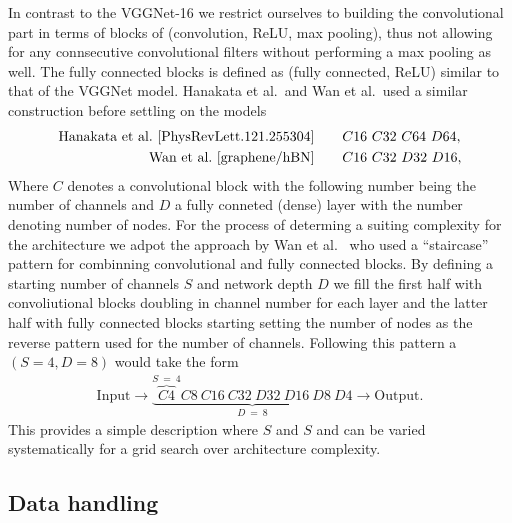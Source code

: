 In contrast to the VGGNet-16 we restrict ourselves to building the convolutional part in terms of blocks of (convolution, ReLU, max pooling), thus not allowing for any connsecutive convolutional filters without performing a max pooling as well. The fully connected blocks is defined as (fully connected, ReLU) similar to that of the VGGNet model. Hanakata et al.\ and Wan et al.\ used a similar construction before settling on the models
\begin{align*}
  \text{Hanakata et al.\ \cite{PhysRevLett.121.255304}} & \qquad C16 \ C32 \ C64 \ D64, \\ 
  \text{Wan et al.\ \cite{graphene/hBN}} & \qquad C16 \ C32 \ D32 \ D16,
\end{align*}
Where $C$ denotes a convolutional block with the following number being the number of channels and $D$ a fully conneted (dense) layer with the number denoting number of nodes. For the process of determing a suiting complexity for the architecture we adpot the approach by Wan et al.\ \cite{graphene/hBN} who used a ``staircase'' pattern for combinning convolutional and fully connected blocks. By defining a starting number of channels $S$ and network depth $D$ we fill the first half with convoliutional blocks doubling in channel number for each layer and the latter half with fully connected blocks starting setting the number of nodes as the reverse pattern used for the number of channels. Following this pattern a $(S=4, D=8)$ would take the form
\begin{align*}
  \text{Input} \to \underbrace{\overbrace{C4}^{S \ = \ 4}C8 \ C16 \ C32 \ D32 \ D16 \ D8 \ D4}_{D \ = \ 8} \to \text{Output}.
\end{align*} 
This provides a simple description where $S$ and $S$ and can be varied systematically for a grid search over architecture complexity. 



\subsection{Data handling}
